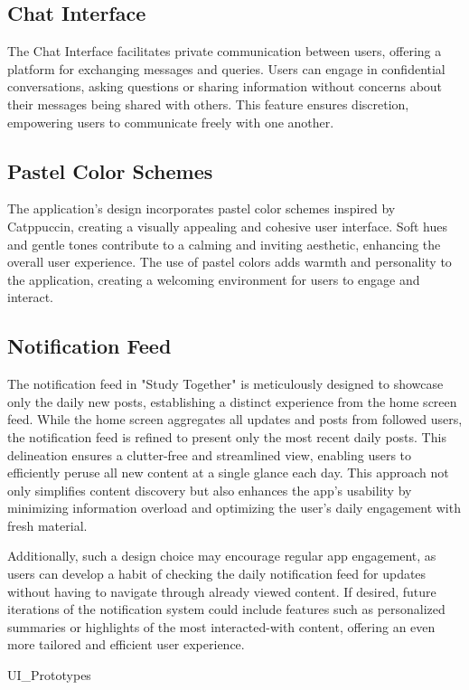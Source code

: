 \subsection{Chat Interface}

The Chat Interface facilitates private communication between users, offering a platform for exchanging messages and queries. Users can engage in confidential conversations, asking questions or sharing information without concerns about their messages being shared with others. This feature ensures discretion, empowering users to communicate freely with one another. 

\subsection{Pastel Color Schemes}

The application's design incorporates pastel color schemes inspired by Catppuccin, creating a visually appealing and cohesive user interface. Soft hues and gentle tones contribute to a calming and inviting aesthetic, enhancing the overall user experience. The use of pastel colors adds warmth and personality to the application, creating a welcoming environment for users to engage and interact.

\subsection{Notification Feed}

The notification feed in "Study Together" is meticulously designed to showcase only the daily new posts, establishing a distinct experience from the home screen feed. While the home screen aggregates all updates and posts from followed users, the notification feed is refined to present only the most recent daily posts. This delineation ensures a clutter-free and streamlined view, enabling users to efficiently peruse all new content at a single glance each day. This approach not only simplifies content discovery but also enhances the app’s usability by minimizing information overload and optimizing the user’s daily engagement with fresh material.

Additionally, such a design choice may encourage regular app engagement, as users can develop a habit of checking the daily notification feed for updates without having to navigate through already viewed content. If desired, future iterations of the notification system could include features such as personalized summaries or highlights of the most interacted-with content, offering an even more tailored and efficient user experience.

{UI_Prototypes}
